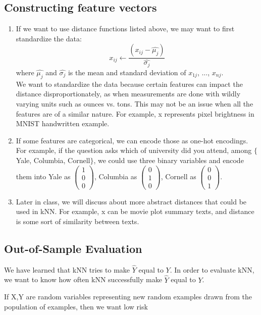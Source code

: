 \documentclass[a4paper]{article}
\begin{document}
\subsection{Constructing feature vectors}
\begin{enumerate}
\item If we want to use distance functions listed above, we may want to first standardize the data: 
\[ x_{ij} \leftarrow \frac{\left ( x_{ij} -\widehat{\mu _{j}} \right )}{\widehat{\sigma _{j}}} \]
where $\widehat{\mu _{j}}$ and $\widehat{\sigma _{j}}$ is the mean and standard deviation of $x_{1j}$, ..., $x_{nj}$.
\\ We want to standardize the data because certain features can impact the distance disproportionately, as when measurements are done with wildly varying units such as ounces vs. tons. This may not be an issue when all the features are of a similar nature. For example, x represents pixel brightness in MNIST handwritten example.

\item If some features are categorical, we can encode those as one-hot encodings. \\
For example, if the question asks which of university did you attend, among $\{$ Yale, Columbia, Cornell$\}$, we could use three binary variables and encode them into Yale as $\begin{pmatrix} 1\\ 0\\ 0\end{pmatrix}$, Columbia as $\begin{pmatrix} 0\\ 1\\ 0\end{pmatrix}$, Cornell as $\begin{pmatrix} 0\\ 0\\ 1\end{pmatrix}$.

\item Later in class, we will discuss about more abstract distances that could be used in kNN. For example, x can be movie plot summary texts, and distance is some sort of similarity between texts.
\end{enumerate}

\subsection{Out-of-Sample Evaluation}
\par We have learned that kNN tries to make $\widehat{Y}$ equal to $Y$. In order to evaluate kNN, we want to know how often kNN successfully make $\widehat{Y}$ equal to $Y$. 
\\
\par If X,Y are random variables representing new random examples drawn from the population of examples, then we want low risk
\end{document}
